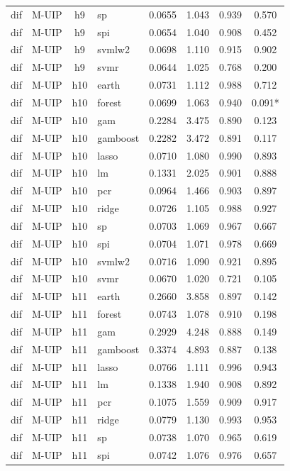 \begin{ThreePartTable}
\begin{longtable}[t]{llclcccc}
dif & M-UIP & h9 & sp & 0.0655 & 1.043 & 0.939 & 0.570\\
dif & M-UIP & h9 & spi & 0.0654 & 1.040 & 0.908 & 0.452\\
dif & M-UIP & h9 & svmlw2 & 0.0698 & 1.110 & 0.915 & 0.902\\
dif & M-UIP & h9 & svmr & 0.0644 & 1.025 & 0.768 & 0.200\\
\addlinespace
dif & M-UIP & h10 & earth & 0.0731 & 1.112 & 0.988 & 0.712\\
dif & M-UIP & h10 & forest & 0.0699 & 1.063 & 0.940 & 0.091*\\
dif & M-UIP & h10 & gam & 0.2284 & 3.475 & 0.890 & 0.123\\
dif & M-UIP & h10 & gamboost & 0.2282 & 3.472 & 0.891 & 0.117\\
dif & M-UIP & h10 & lasso & 0.0710 & 1.080 & 0.990 & 0.893\\
dif & M-UIP & h10 & lm & 0.1331 & 2.025 & 0.901 & 0.888\\
dif & M-UIP & h10 & pcr & 0.0964 & 1.466 & 0.903 & 0.897\\
dif & M-UIP & h10 & ridge & 0.0726 & 1.105 & 0.988 & 0.927\\
dif & M-UIP & h10 & sp & 0.0703 & 1.069 & 0.967 & 0.667\\
dif & M-UIP & h10 & spi & 0.0704 & 1.071 & 0.978 & 0.669\\
dif & M-UIP & h10 & svmlw2 & 0.0716 & 1.090 & 0.921 & 0.895\\
dif & M-UIP & h10 & svmr & 0.0670 & 1.020 & 0.721 & 0.105\\
\addlinespace
dif & M-UIP & h11 & earth & 0.2660 & 3.858 & 0.897 & 0.142\\
dif & M-UIP & h11 & forest & 0.0743 & 1.078 & 0.910 & 0.198\\
dif & M-UIP & h11 & gam & 0.2929 & 4.248 & 0.888 & 0.149\\
dif & M-UIP & h11 & gamboost & 0.3374 & 4.893 & 0.887 & 0.138\\
dif & M-UIP & h11 & lasso & 0.0766 & 1.111 & 0.996 & 0.943\\
dif & M-UIP & h11 & lm & 0.1338 & 1.940 & 0.908 & 0.892\\
dif & M-UIP & h11 & pcr & 0.1075 & 1.559 & 0.909 & 0.917\\
dif & M-UIP & h11 & ridge & 0.0779 & 1.130 & 0.993 & 0.953\\
dif & M-UIP & h11 & sp & 0.0738 & 1.070 & 0.965 & 0.619\\
dif & M-UIP & h11 & spi & 0.0742 & 1.076 & 0.976 & 0.657\\

\end{longtable}
\end{ThreePartTable}
